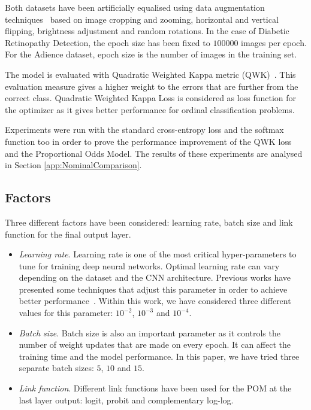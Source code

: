 \documentclass[journal]{IEEEtran}
\begin{document}
	Both datasets have been artificially equalised using data augmentation techniques~\cite{van2001art, krizhevsky2012imagenet} based on image cropping and zooming, horizontal and vertical flipping, brightness adjustment and random rotations. In the case of Diabetic Retinopathy Detection, the epoch size has been fixed to $100000$ images per epoch. For the Adience dataset, epoch size is the number of images in the training set.
	
	The model is evaluated with Quadratic Weighted Kappa metric (QWK)~\cite{ben2008comparison}. This evaluation measure gives a higher weight to the errors that are further from the correct class. Quadratic Weighted Kappa Loss is considered as loss function for the optimizer as it gives better performance for ordinal classification problems.
	
	Experiments were run with the standard cross-entropy loss and the softmax function too in order to prove the performance improvement of the QWK loss and the Proportional Odds Model. The results of these experiments are analysed in Section \ref{app:NominalComparison}.
	
	\subsection{Factors}
	Three different factors have been considered: learning rate, batch size and link function for the final output layer.
	
	\begin{itemize}
		\item \textit{Learning rate}. Learning rate is one of the most critical hyper-parameters to tune for training deep neural networks. Optimal learning rate can vary depending on the dataset and the CNN architecture. Previous works have presented some techniques that adjust this parameter in order to achieve better performance~\cite{smith2017cyclical, senior2013empirical}. Within this work, we have considered three different values for this parameter: $10^{-2}$, $10^{-3}$ and $10^{-4}$.
		\item \textit{Batch size}. Batch size is also an important parameter as it controls the number of weight updates that are made on every epoch. It can affect the training time and the model performance. In this paper, we have tried three separate batch sizes: $5$, $10$ and $15$.
		\item \textit{Link function}. Different link functions have been used for the POM at the last layer output: logit, probit and complementary log-log.
	\end{itemize}
	
\end{document}
